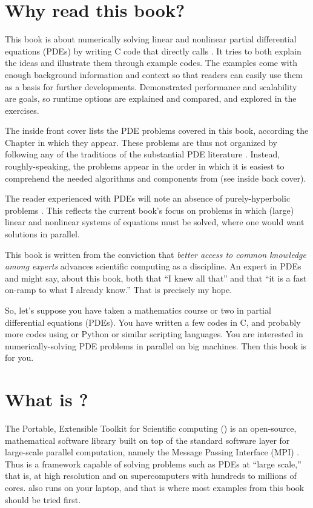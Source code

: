 
\section{Why read this book?}

This book is about numerically solving linear and nonlinear partial differential equations (PDEs) by writing C code \citep{KernighanRitchie1988} that directly calls \PETSc.  It tries to both explain the ideas and illustrate them through example codes.  The examples come with enough background information and context so that readers can easily use them as a basis for further developments.  Demonstrated performance and scalability are goals, so runtime options are explained and compared, and explored in the exercises.

The inside front cover lists the PDE problems covered in this book, according the Chapter in which they appear.  These problems are thus not organized by following any of the traditions of the substantial PDE literature \citep[for just a start]{Evans2010,Ockendonetal2003}.  Instead, roughly-speaking, the problems appear in the order in which it is easiest to comprehend the needed algorithms and components from \PETSc (see inside back cover).

The reader experienced with PDEs will note an absence of purely-hyperbolic problems \citep[compare][]{LeVeque2002}.  This reflects the current book's focus on problems in which (large) linear and nonlinear systems of equations must be solved, where one would want solutions in parallel.

This book is written from the conviction that \emph{better access to common knowledge among experts} advances scientific computing as a discipline.  An expert in PDEs and \PETSc might say, about this book, both that ``I knew all that'' and that ``it is a fast on-ramp to what I already know.''  That is precisely my hope.

So, let's suppose you have taken a mathematics course or two in partial differential equations (PDEs).  You have written a few codes in C, and probably more codes using \Matlab or Python or similar scripting languages.  You are interested in numerically-solving PDE problems in parallel on big machines.  Then this book is for you.

\section{What is \PETSc?}

The Portable, Extensible Toolkit for Scientific computing (\PETSc) is an open-source, mathematical software library built on top of the standard software layer for large-scale parallel computation, namely the Message Passing Interface (MPI) \citep{Groppetal1999}.  Thus \PETSc is a framework capable of solving problems such as PDEs at ``large scale,'' that is, at high resolution and on supercomputers with hundreds to millions of cores.  \PETSc also runs on your laptop, and that is where most examples from this book should be tried first.

